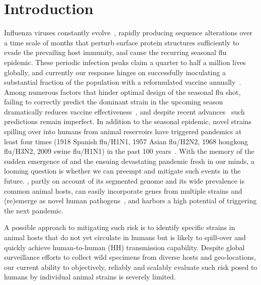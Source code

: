 \documentclass[onecolumn, compsoc,10pt]{IEEEtran}
\begin{document}
\vspace{10pt}
\section*{Introduction}
Influenza viruses constantly evolve~\cite{dos2016influenza},  rapidly producing  sequence alterations over a time scale of months  that  perturb surface protein structures sufficiently to evade the prevailing host immunity, and cause the  recurring seasonal flu epidemic. These periodic  infection peaks claim a quarter to half a million lives~\cite{huddleston2020integrating} globally,  and currently our response hinges on  successfully inoculating a substantial fraction of the  population with a  reformulated  vaccine annually~\cite{boni2008vaccination,dos2016influenza}.  Among numerous factors that hinder optimal design of the seasonal flu shot, failing to correctly predict the dominant strain in the upcoming season dramatically reduces vaccine effectiveness~\cite{tricco2013comparing}, and despite  recent advances~\cite{neher2014predicting,huddleston2020integrating} such predictions remain imperfect. In addition to  the seasonal  epidemic, novel \infl strains spilling over into humans from animal reservoirs have triggered  pandemics  at least four times (1918 Spanish flu/H1N1, 1957 Asian flu/H2N2, 1968 hongkong flu/H3N2, 2009 swine flu/H1N1) in the past 100 years~\cite{shao2017evolution}. With the memory of the  sudden emergence of \cov and the ensuing devastating pandemic fresh in our minds, a looming question  is whether we can  preempt and mitigate such events in the future.  \infl,  partly on account of its segmented genome and its wide prevalence is common animal hosts, can easily incorporate genes from multiple strains and (re)emerge as novel human pathogens~\cite{reid2003origin,vergara2014ns}, and   harbors  a high potential  of triggering the next  pandemic.



A possible approach to mitigating such risk is to identify specific strains in animal hosts that do not yet circulate in humans but is likely to spill-over and quickly achieve human-to-human (HH) transmission capability. Despite global surveillance efforts to  collect wild specimens from diverse hosts and geo-locations, our  current ability to objectively, reliably and scalably  evaluate such risk posed to  humans by  individual animal  strains  is severely limited.
\end{document}
